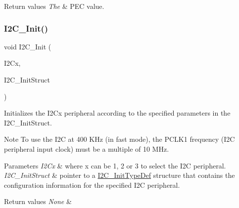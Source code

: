 \begin{DoxyRetVals}{Return values}
{\em The} & P\+EC value. \\
\hline
\end{DoxyRetVals}
\mbox{\label{group___i2_c_gaac29465bca70fbc91c2f922ab67bb88e}} 
\subsubsection{\texorpdfstring{I2\+C\+\_\+\+Init()}{I2C\_Init()}}
{\footnotesize\ttfamily void I2\+C\+\_\+\+Init (\begin{DoxyParamCaption}\item[{I2\+C\+\_\+\+Type\+Def $\ast$}]{I2\+Cx,  }\item[{\mbox{\hyperlink{struct_i2_c___init_type_def}{I2\+C\+\_\+\+Init\+Type\+Def}} $\ast$}]{I2\+C\+\_\+\+Init\+Struct }\end{DoxyParamCaption})}



Initializes the I2\+Cx peripheral according to the specified parameters in the I2\+C\+\_\+\+Init\+Struct. 

\begin{DoxyNote}{Note}
To use the I2C at 400 K\+Hz (in fast mode), the P\+C\+L\+K1 frequency (I2C peripheral input clock) must be a multiple of 10 M\+Hz. ~\newline
 
\end{DoxyNote}

\begin{DoxyParams}{Parameters}
{\em I2\+Cx} & where x can be 1, 2 or 3 to select the I2C peripheral. \\
\hline
{\em I2\+C\+\_\+\+Init\+Struct} & pointer to a \mbox{\hyperlink{struct_i2_c___init_type_def}{I2\+C\+\_\+\+Init\+Type\+Def}} structure that contains the configuration information for the specified I2C peripheral. \\
\hline
\end{DoxyParams}

\begin{DoxyRetVals}{Return values}
{\em None} & \\
\hline
\end{DoxyRetVals}
\mbox{\label{group___i2_c_ga58fed146a06cb81d2940604e460de047}} 

